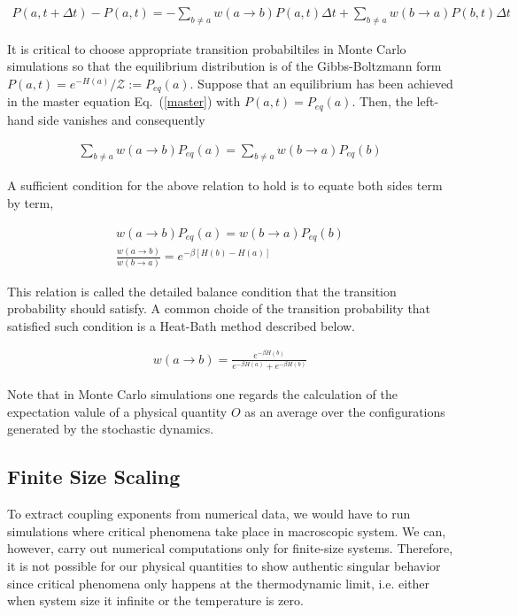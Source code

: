 \documentclass[%
 reprint,
 amsmath,amssymb,
 aps,
]{revtex4-2}
\begin{document}
\begin{widetext}
\begin{eqnarray}
P(a,t+\Delta t) - P(a, t) = -\sum_{b \ne a} w(a \rightarrow b) P(a,t) \Delta t + 
\sum_{b \ne a} w(b \rightarrow a) P(b,t) \Delta t \label{master}
\end{eqnarray}
\end{widetext}

It is critical to choose appropriate transition probabiltiles in Monte Carlo simulations 
so that the equilibrium distribution is of the Gibbs-Boltzmann form $P(a,t) = e^{-H(a)}/
\mathcal{Z}:=P_{eq}(a)$. Suppose that an equilibrium has been achieved in the master 
equation Eq.~(\ref{master}) with $P(a,t) = P_{eq}(a)$. Then, the left-hand side vanishes and consequently

\begin{eqnarray}
\sum_{b \ne a} w(a \rightarrow b) P_{eq}(a) = \sum_{b \ne a} w(b \rightarrow a) P_{eq}(b)
\end{eqnarray}

A sufficient condition for the above relation to hold is to equate both sides term by term,

\begin{gather}
w(a \rightarrow b) P_{eq}(a) = w(b \rightarrow a) P_{eq}(b) \\
\frac{w(a \rightarrow b)}{w(b \rightarrow a)} = e^{-\beta \left[H(b) - H(a)\right]} \label{balcond}
\end{gather}

This relation is called the detailed balance condition that the transition probability 
should satisfy. A common choide of the transition probability that satisfied such condition
is a Heat-Bath method described below.

\begin{eqnarray}
w(a \rightarrow b) = \frac{e^{-\beta H(b)}}{e^{-\beta H(a)} + e^{-\beta H(b)}} \label{heat-bath}
\end{eqnarray}

Note that in Monte Carlo simulations one regards the calculation of the expectation valule 
of a physical quantity $O$ as an average over the configurations generated by the stochastic 
dynamics.

\subsection{Finite Size Scaling}
To extract coupling exponents from numerical data, we would have to run simulations 
where critical phenomena take place in macroscopic system. We can, however, carry out 
numerical computations only for finite-size systems. Therefore, it is not possible for 
our physical quantities to show authentic singular behavior since critical phenomena 
only happens at the thermodynamic limit, i.e. either when system size it infinite or 
the temperature is zero.\\ 
\end{document}
